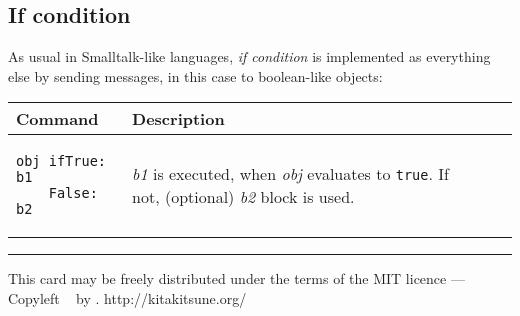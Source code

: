 \documentclass[10pt]{article}
\begin{document}
\begin{multicols*}{3}
\subsection{If condition}

As usual in Smalltalk-like languages, \textit{if condition} is implemented as everything else by sending messages, in this case to boolean-like objects:

\vspace*{0.2cm}
\begin{tabular}{ p{3.4cm} p{4cm} l l }
Command & Description \\ \hline
\begin{verbatim}
obj ifTrue: b1
    False: b2
\end{verbatim}
& \textit{b1} is executed, when \textit{obj} evaluates to \texttt{true}.
If not, (optional) \textit{b2} block is used. \\
\hline


\end{tabular}





\vfill \hrule\smallskip
{\small This card may be freely distributed under
the terms of the MIT licence ---
Copyleft \textcopyleft\ \thedate{} by \theauthor{}.}
{\small http://kitakitsune.org/}
\end{multicols*}
\end{document}
